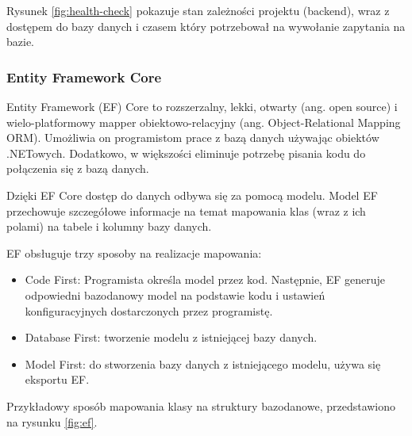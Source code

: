 \documentclass[12pt]{article}
\numberwithin{figure}{section}
\begin{document}
\begin{sloppypar}
Rysunek \ref{fig:health-check} pokazuje stan zależności projektu (backend), wraz z dostępem do bazy danych i czasem który potrzebował na wywołanie zapytania na bazie.

\label{EF}
\subsubsection{Entity Framework Core}
Entity Framework (EF) Core to rozszerzalny, lekki, otwarty (ang. open source) i wielo-platformowy mapper obiektowo-relacyjny (ang. Object-Relational Mapping ORM). Umożliwia on programistom prace z bazą danych używając obiektów .NETowych. Dodatkowo, w większości eliminuje potrzebę pisania kodu do połączenia się z bazą danych. 
    
Dzięki EF Core dostęp do danych odbywa się za pomocą modelu. Model EF przechowuje szczegółowe informacje na temat mapowania klas (wraz z ich polami) na tabele i kolumny bazy danych.
    
EF obsługuje trzy sposoby na realizacje mapowania:
    
\begin{itemize}
    \item Code First: Programista określa model przez kod. Następnie, EF generuje odpowiedni bazodanowy model na podstawie kodu i ustawień konfiguracyjnych dostarczonych przez programistę.
    \item Database First: tworzenie modelu z istniejącej bazy danych.
    \item Model First: do stworzenia bazy danych z istniejącego modelu, używa się eksportu EF.
\end{itemize}
    
Przykładowy sposób mapowania klasy na struktury bazodanowe, przedstawiono na rysunku \ref{fig:ef}.
    

\end{sloppypar}
\end{document}
